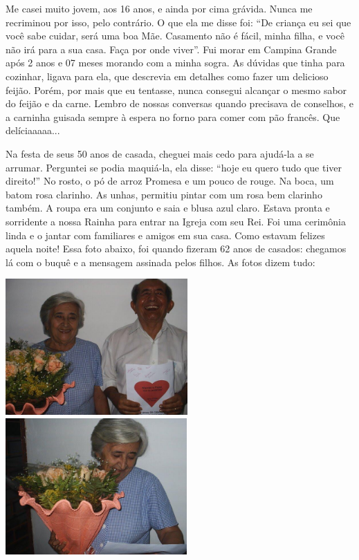 \documentclass[
  brazil,
  a6paper,
  oneside,
  landscape,
  14pt]{scrbook}
\begin{document}
Me casei muito jovem, aos 16 anos, e ainda por cima grávida. Nunca me
recriminou por isso, pelo contrário. O que ela me disse foi: ``De
criança eu sei que você sabe cuidar, será uma boa Mãe. Casamento não é
fácil, minha filha, e você não irá para a sua casa. Faça por onde
viver''. Fui morar em Campina Grande após 2 anos e 07 meses morando com
a minha sogra. As dúvidas que tinha para cozinhar, ligava para ela, que
descrevia em detalhes como fazer um delicioso feijão. Porém, por mais
que eu tentasse, nunca consegui alcançar o mesmo sabor do feijão e da
carne. Lembro de nossas conversas quando precisava de conselhos, e a
carninha guisada sempre à espera no forno para comer com pão francês.
Que delíciaaaaa...

Na festa de seus 50 anos de casada, cheguei mais cedo para ajudá-la a se
arrumar. Perguntei se podia maquiá-la, ela disse: ``hoje eu quero tudo
que tiver direito!'' No rosto, o pó de arroz Promesa e um pouco de
rouge. Na boca, um batom rosa clarinho. As unhas, permitiu pintar com um
rosa bem clarinho também. A roupa era um conjunto e saia e blusa azul
claro. Estava pronta e sorridente a nossa Rainha para entrar na Igreja
com seu Rei. Foi uma cerimônia linda e o jantar com familiares e amigos
em sua casa. Como estavam felizes aquela noite! Essa foto abaixo, foi
quando fizeram 62 anos de casados: chegamos lá com o buquê e a mensagem
assinada pelos filhos. As fotos dizem tudo:

\includegraphics[width=2.73889in,height=2.05417in]{img/cristina/image5.jpeg}\includegraphics[width=2.72917in,height=2.04687in]{img/cristina/image6.jpeg}
\end{document}
